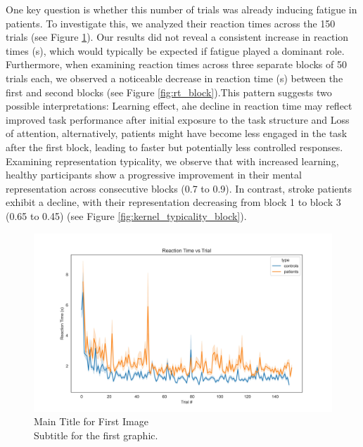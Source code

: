 One key question is whether this number of trials was already inducing fatigue in patients. To investigate this, we analyzed their reaction times across the 150 trials (see Figure \ref{fig:rt_clinical}). Our results did not reveal a consistent increase in reaction times (s), which would typically be expected if fatigue played a dominant role. Furthermore, when examining reaction times across three separate blocks of 50 trials each, we observed a noticeable decrease in reaction time (s) between the first and second blocks (see Figure \ref{fig:rt_block}).This pattern suggests two possible interpretations: Learning effect, ahe decline in reaction time may reflect improved task performance after initial exposure to the task structure and Loss of attention, alternatively, patients might have become less engaged in the task after the first block, leading to faster but potentially less controlled responses. Examining representation typicality, we observe that with increased learning, healthy participants show a progressive improvement in their mental representation across consecutive blocks (0.7 to 0.9). In contrast, stroke patients exhibit a decline, with their representation decreasing from block 1 to block 3 (0.65 to 0.45) (see Figure \ref{fig:kernel_typicality_block}).
\begin{figure}[ht!]
    \centering
    \includegraphics[width=15cm]{MainLayout/Images/chapter5/rt_clinical.jpg}
    \caption{Main Title for First Image \\ \small Subtitle for the first graphic.}
    \label{fig:rt_clinical}
\end{figure}

